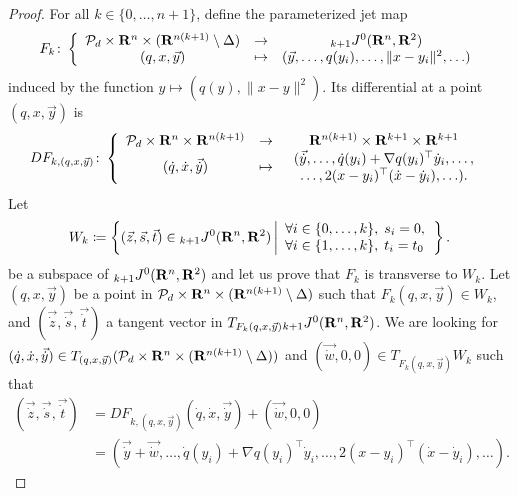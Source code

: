 \begin{proof}
  For all $k \in \{0, \ldots, n + 1\}$, define the parameterized jet map
  \[
    F_k \colon \left\{
    \begin{array}{ccc}
      \mathcal{P}_d \times \mathbf{R}^n \times (\mathbf{R}^{n(k + 1)} \setminus \Delta) & \to & {}_{k + 1} J^0(\mathbf{R}^n, \mathbf{R}^2) \\
      (q, x, \vec{y}) & \mapsto & (\vec{y}, \ldots, q(y_i), \ldots, \| x - y_i \|^2, \ldots)
    \end{array}
    \right.
  \]
  induced by the function $y \mapsto (q(y), \| x - y \|^2)$. Its differential at a point $(q, x, \vec{y})$ is
  \[
    DF_{k, (q, x, \vec{y})} \colon \left\{ \begin{array}{ccc}
      \mathcal{P}_d \times \mathbf{R}^n \times \mathbf{R}^{n (k + 1)}
      & \to
      & \mathbf{R}^{n (k + 1)} \times \mathbf{R}^{k + 1} \times \mathbf{R}^{k + 1}
    \\
      (\dot{q}, \dot{x}, \vec{\dot{y}})
      & \mapsto
      & \begin{array}{c}
        (\vec{\dot{y}}, \ldots, \dot{q}(y_i) + \nabla q(y_i)^\top \dot{y}_i, \ldots, \\
        \ldots, 2(x - y_i)^\top (\dot{x} - \dot{y}_i), \ldots).
      \end{array}
    \end{array} \right.
  \]
  Let
  \[
    W_k \coloneq \left\{
      (\vec z, \vec s, \vec t) \in {}_{k + 1} J^0(\mathbf{R}^n, \mathbf{R}^2)
      \left|
      \begin{array}{l}
      \forall i \in \{0, \ldots, k\}, \; s_i = 0, \\
      \forall i \in \{1, \ldots, k\}, \; t_i = t_0
      \end{array}
      \right.
    \right\}.
  \]
  be a subspace of ${}_{k + 1} J^0(\mathbf{R}^n, \mathbf{R}^2)$ and let us prove that $F_k$ is transverse to $W_k$. Let $(q, x, \vec{y})$ be a point in $\mathcal{P}_d \times \mathbf{R}^n \times (\mathbf{R}^{n(k + 1)} \setminus \Delta)$ such that $F_k(q, x, \vec{y}) \in W_k$, and $(\vec{\dot{z}}, \vec{\dot{s}}, \vec{\dot{t}})$ a tangent vector in $T_{F_k(q, x, \vec{y})} {}_{k + 1} J^0(\mathbf{R}^n, \mathbf{R}^2)$. We are looking for $(\dot{q}, \dot{x}, \vec{\dot{y}}) \in T_{(q, x, \vec{y})} (\mathcal{P}_d \times \mathbf{R}^n \times (\mathbf{R}^{n(k + 1)} \setminus \Delta))$ and $(\vec{\dot{w}}, 0, 0) \in T_{F_k(q, x, \vec{y})} W_k$ such that
  \begin{align*}
    (\vec{\dot{z}}, \vec{\dot{s}}, \vec{\dot{t}}) & = DF_{k, (q, x, \vec{y})} (\dot{q}, \dot{x}, \vec{\dot{y}}) + (\vec{\dot{w}}, 0, 0) \\
    & = (\vec{\dot{y}} + \vec{\dot{w}}, \ldots, \dot{q}(y_i) + \nabla q(y_i)^\top \dot{y}_i, \ldots, 2(x - y_i)^\top (\dot{x} - \dot{y}_i), \ldots).

\end{align*}
\end{proof}
